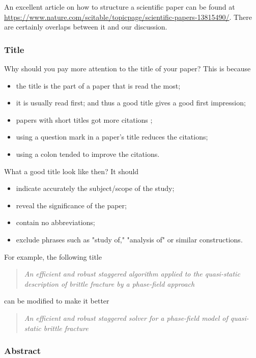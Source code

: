 \documentclass[authoryear,12pta4paper,fleqn]{article}
\numberwithin{equation}{section}
\theoremstyle{remark}
\begin{document}
An excellent article on how to structure a scientific paper can be found at \url{https://www.nature.com/scitable/topicpage/scientific-papers-13815490/}. There are certainly overlaps between it and our discussion. 



\subsubsection{Title}\label{sec:title}

Why should you pay more attention to the title of your paper? This is because
\begin{itemize}
\item the title  is the part of a paper that is read the most;
\item it is usually read first; and thus a good title gives a good first impression;
\item papers with short titles  got more citations \citep{paiva2012articles};
\item using a question mark in a paper’s title reduces the citations;
\item using a colon tended to improve the citations.
\end{itemize}

What a good title look like then? It should

\begin{itemize}
\item indicate accurately the subject/scope of the study;
\item reveal the significance of the paper;
\item contain no abbreviations;
\item exclude phrases such as "study of," "analysis of" or similar constructions.
\end{itemize}

For example, the following title 
\begin{quote}
  \textit{An efficient and robust staggered algorithm applied to the quasi-static description 
  of brittle fracture by a phase-field approach}
 \end{quote}
can be modified to make it better
\begin{quote}
  \textit{An efficient and robust staggered solver for a phase-field model of  quasi-static 
  brittle fracture}
\end{quote}
\subsubsection{Abstract}\label{sec:abstract}
\end{document}
